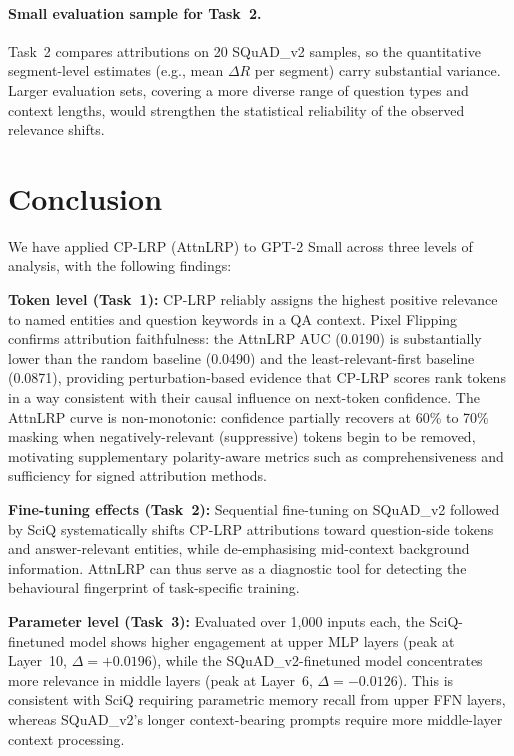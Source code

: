 \documentclass[10pt,twocolumn,letterpaper]{article}
\begin{document}
\paragraph{Small evaluation sample for Task~2.}
Task~2 compares attributions on 20 SQuAD\_v2 samples, so the quantitative
segment-level estimates (e.g., mean $\Delta R$ per segment) carry substantial
variance.
Larger evaluation sets, covering a more diverse range of question types and
context lengths, would strengthen the statistical reliability of the
observed relevance shifts.

\section{Conclusion}
\label{sec:conclusion}

We have applied CP-LRP (AttnLRP) to GPT-2 Small across three levels of
analysis, with the following findings:

\textbf{Token level (Task~1):} CP-LRP reliably assigns the highest positive
relevance to named entities and question keywords in a QA context.
Pixel Flipping confirms attribution faithfulness: the AttnLRP AUC (0.0190) is
substantially lower than the random baseline (0.0490) and the
least-relevant-first baseline (0.0871), providing perturbation-based evidence that CP-LRP scores rank tokens
in a way consistent with their causal influence on next-token confidence.
The AttnLRP curve is non-monotonic: confidence partially recovers at
60\% to 70\% masking when negatively-relevant (suppressive) tokens begin to be
removed, motivating supplementary polarity-aware metrics such as
comprehensiveness and sufficiency for signed attribution methods.

\textbf{Fine-tuning effects (Task~2):} Sequential fine-tuning on SQuAD\_v2
followed by SciQ systematically shifts CP-LRP attributions toward
question-side tokens and answer-relevant entities, while de-emphasising
mid-context background information.
AttnLRP can thus serve as a diagnostic tool for detecting the behavioural
fingerprint of task-specific training.

\textbf{Parameter level (Task~3):} Evaluated over 1{,}000 inputs each,
the SciQ-finetuned model shows higher engagement at upper MLP layers
(peak at Layer~10, $\Delta = +0.0196$), while the SQuAD\_v2-finetuned model
concentrates more relevance in middle layers (peak at Layer~6,
$\Delta = -0.0126$).
This is consistent with SciQ requiring parametric memory recall from upper
FFN layers, whereas SQuAD\_v2's longer context-bearing prompts require more
middle-layer context processing.
\end{document}
